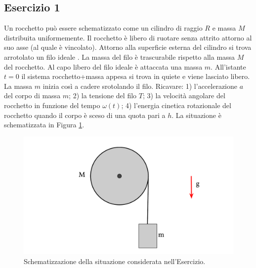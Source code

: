 \documentclass[12pt,a4paper]{book}
\begin{document}
\subsection*{Esercizio 1}
Un rocchetto può essere schematizzato come un cilindro di raggio $R$ e massa $M$ distribuita uniformemente. Il rocchetto è libero di ruotare senza attrito attorno al suo asse (al quale è vincolato). Attorno alla superficie esterna del cilindro si trova arrotolato un filo ideale . La massa del filo è trascurabile rispetto alla massa $M$ del rocchetto. Al capo libero del filo ideale è attaccata una massa $m$. All’istante $t=0$ il sistema rocchetto+massa appesa si trova in quiete e viene lasciato libero. La massa $m$ inizia così a cadere srotolando il filo.  Ricavare: 1) l’accelerazione $a$ del corpo di massa $m$; 2) la tensione del filo $T$; 3) la velocità angolare del rocchetto in funzione del tempo $\omega(t)$; 4) l'energia cinetica rotazionale del rocchetto quando il corpo è sceso di una quota pari a $h$. La situazione è schematizzata in Figura \ref{fig:5-e-1-1}.

\begin{figure}[!ht]
 \centering
\includegraphics[scale=0.45]{e-1-1.pdf}
\caption{Schematizzazione della situazione considerata nell'Esercizio. \label{fig:5-e-1-1} }
\end{figure}
\end{document}

